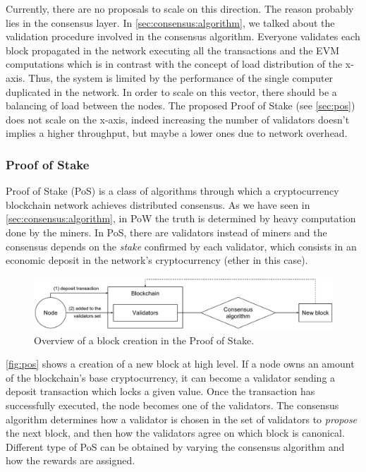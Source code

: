 Currently, there are no proposals to scale on this direction. The reason
probably lies in the consensus layer. In \autoref{sec:consensus:algorithm}, we
talked about the validation procedure involved in the consensus algorithm.
Everyone validates each block propagated in the network executing all the
transactions and the EVM computations which is in contrast with the concept of
load distribution of the x-axis. Thus, the system is limited by the performance
of the single computer duplicated in the network. In order to scale on this
vector, there should be a balancing of load between the nodes. The proposed
Proof of Stake (see \autoref{sec:pos}) does not scale on the
x-axis, indeed increasing the number of validators doesn't implies a higher
throughput, but maybe a lower ones due to network
overhead\cite{bib:cbc-casper}.

\subsubsection{Proof of Stake}
\label{sec:pos}
Proof of Stake (PoS) is a class of algorithms through which a cryptocurrency
blockchain network achieves distributed consensus. As we have seen in
\autoref{sec:consensus:algorithm}, in PoW the truth is determined by heavy
computation done by the miners. In PoS, there are validators instead of miners
and the consensus depends on the \emph{stake} confirmed by each validator, which
consists in an economic deposit in the network's cryptocurrency (ether in this
case).

\begin{figure}
	\begin{center}
		\includegraphics[width=\textwidth]{./res/img/pos.pdf}
	\end{center}
	\caption{Overview of a block creation in the Proof of Stake.}
	\label{fig:pos}
\end{figure}

\autoref{fig:pos} shows a creation of a new block at high level. If a node owns
an amount of the blockchain's base cryptocurrency, it can become a validator
sending a deposit transaction which locks a given value. Once the transaction
has successfully executed, the node becomes one of the validators. The consensus
algorithm determines how a validator is chosen in the set of validators to
\emph{propose} the next block, and then how the validators agree on which block
is canonical. Different type of PoS can be obtained by varying the consensus
algorithm and how the rewards are assigned.



